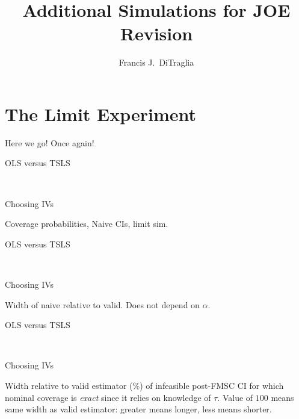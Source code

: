 \documentclass[12pt,letterpaper]{article}
\title{Additional Simulations for JOE Revision}
\author{Francis J.\ DiTraglia}
\begin{document}
\maketitle

\section{The Limit Experiment}
Here we go!
Once again!

\begin{table}[h]
  \centering
  \begin{subtable}{0.48\textwidth}
    \caption{OLS versus TSLS}
    
  \end{subtable}
  ~
  \begin{subtable}{0.48\textwidth}
    \caption{Choosing IVs}
    
  \end{subtable}
  \label{tab:LimitNaiveCover}
  \caption{Coverage probabilities, Naive CIs, limit sim.}
\end{table}

\begin{table}[h]
  \centering
  \begin{subtable}{0.48\textwidth}
    \caption{OLS versus TSLS}
    
  \end{subtable}
  ~
  \begin{subtable}{0.48\textwidth}
    \caption{Choosing IVs}
    
  \end{subtable}
  \label{tab:LimitNaiveWidth}
  \caption{Width of naive relative to valid. Does not depend on $\alpha$.}
\end{table}

\begin{table}[h]
  \centering
  \begin{subtable}{0.48\textwidth}
    \caption{OLS versus TSLS}
    
  \end{subtable}
  ~
  \begin{subtable}{0.48\textwidth}
    \caption{Choosing IVs}
    
  \end{subtable}
  \label{tab:WidthInfeasible}
  \caption{Width relative to valid estimator (\%) of infeasible post-FMSC CI for which nominal coverage is \emph{exact} since it relies on knowledge of $\tau$. Value of $100$ means same width as valid estimator: greater means longer, less means shorter.}
\end{table}
\end{document}

